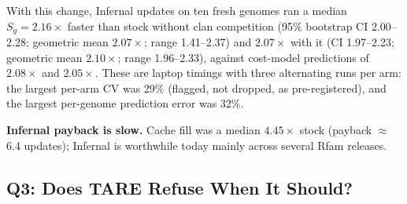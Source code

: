 \documentclass[letterpaper,twocolumn,10pt]{article}
\theoremstyle{definition}
\newcommand{\sys}{TARE\xspace}
\newcommand{\sys}{PARE\xspace}
\begin{document}
With this change, Infernal updates on ten fresh genomes ran a median $S_g = 2.16\times$ faster than stock without clan
competition (95\% bootstrap CI 2.00--2.28; geometric mean $2.07\times$; range 1.41--2.37) and $2.07\times$ with it (CI
1.97--2.23; geometric mean $2.10\times$; range 1.96--2.33), against cost\nobreakdash-model predictions of $2.08\times$ and $2.05\times$.
These are laptop timings with three alternating runs per arm: the largest per\nobreakdash-arm CV was 29\% (flagged, not dropped, as
pre\nobreakdash-registered), and the largest per\nobreakdash-genome prediction error was 32\%.

\textbf{Infernal payback is slow.} Cache fill was a median $4.45\times$ stock (payback $\approx$6.4 updates); Infernal is worthwhile today mainly across several Rfam releases.

\subsection{Q3: Does \sys Refuse When It Should?}
\label{sec:eval-safety}
\end{document}
